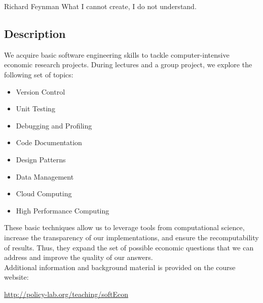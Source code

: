


\vspace{-3cm}

\doublespacing
\thispagestyle{empty}\vspace{-2cm}

\vspace{0.3cm}\begin{manquotation}{Richard Feynman} What I cannot create, I do not understand.
\end{manquotation}
\subsection*{Description}\vspace{0.5cm}
We acquire basic software engineering skills to tackle computer-intensive economic research projects. During lectures and a group project, we explore the following set of topics:
%
\begin{multicols}{2}
\begin{itemize}
\item Version Control
\item Unit Testing
\item Debugging and Profiling
\item Code Documentation
\item Design Patterns
\item Data Management
\item Cloud Computing
\item High Performance Computing
\end{itemize}
\end{multicols}
%
\noindent These basic techniques allow us to leverage tools from computational science, increase the transparency of our implementations, and ensure the recomputability of results. Thus, they expand the set of possible economic questions that we can address and improve the quality of our answers.\\\newline
%
\noindent Additional information and background material is provided on the course website:
\begin{center}
\url{http://policy-lab.org/teaching/softEcon} 
\end{center}\vspace{0.3cm}
